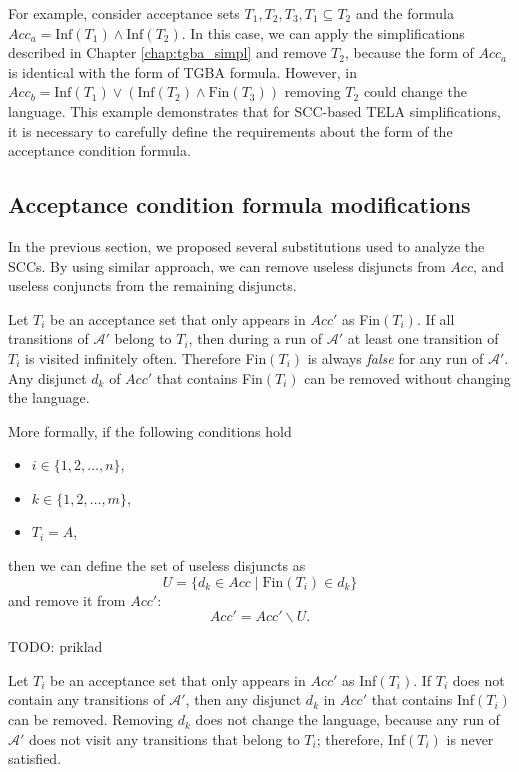 \documentclass[
  digital, %
  twoside, %
  table,   %
  lof,     %
  lot,     %
]{fithesis3}
\begin{document}
For example, consider acceptance sets $T_1, T_2, T_3, T_1 \subseteq T_2$ and the formula $Acc_a = \text{Inf}(T_1) \wedge \text{Inf}(T_2)$. In this case, we can apply the simplifications described in Chapter \ref{chap:tgba_simpl} and remove $T_2$, because the form of $Acc_a$ is identical with the form of TGBA formula. However, in $Acc_b = \text{Inf}(T_1) \vee (\text{Inf}(T_2) \wedge \text{Fin}(T_3))$ removing $T_2$ could change the language. This example demonstrates that for SCC-based TELA simplifications, it is necessary to carefully define the requirements about the form of the acceptance condition formula.

\subsection{Acceptance condition formula modifications}
In the previous section, we proposed several substitutions used to analyze the SCCs. By using similar approach, we can remove useless disjuncts from $Acc$, and useless conjuncts from the remaining disjuncts.

Let $T_i$ be an acceptance set that only appears in $Acc'$ as Fin$(T_i)$. If all transitions of $\mathcal{A'}$ belong to $T_i$, then during a run of $\mathcal{A'}$ at least one transition of $T_i$ is visited infinitely often. Therefore Fin$(T_i)$ is always \emph{false} for any run of $\mathcal{A'}$. Any disjunct $d_k$ of $Acc'$ that contains Fin$(T_i)$ can be removed without changing the language.

More formally, if the following conditions hold
\begin{itemize}
  \item $i \in \{1,2, \dots, n\}$,
  \item $k\in \{1,2, \dots, m\}$,
  \item $T_i = A$,
\end{itemize}
then we can define the set of useless disjuncts as
\begin{equation*}
  U = \{d_k \in Acc \mid \text{Fin}(T_i) \in d_k \}
\end{equation*}
and remove it from $Acc'$:
\begin{equation*}
  Acc' = Acc' \smallsetminus U.
\end{equation*}

TODO: priklad

Let $T_i$ be an acceptance set that only appears in $Acc'$ as Inf$(T_i)$. If $T_i$ does not contain any transitions of $\mathcal{A'}$, then any disjunct $d_k$ in $Acc'$ that contains Inf$(T_i)$ can be removed. Removing $d_k$ does not change the language, because any run of $\mathcal{A'}$ does not visit any transitions that belong to $T_i$; therefore, Inf$(T_i)$ is never satisfied.
\end{document}
